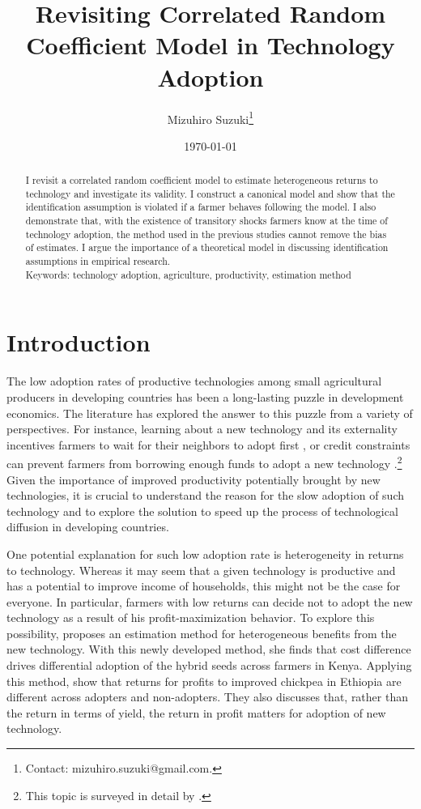 \documentclass[11pt,letterpaper]{article}
\title{Revisiting Correlated Random Coefficient Model in Technology Adoption}
\author{
  Mizuhiro Suzuki\thanks{
    Contact: mizuhiro.suzuki@gmail.com.
  }
}
\date{\today}
\begin{document}
  
\maketitle
\begin{abstract}
  \singlespacing
    \noindent 
    I revisit a correlated random coefficient model to estimate heterogeneous returns to technology and investigate its validity.
    I construct a canonical model and show that the identification assumption is violated if a farmer behaves following the model. 
    I also demonstrate that, with the existence of transitory shocks farmers know at the time of technology adoption, the method used in the previous studies cannot remove the bias of estimates.
    I argue the importance of a theoretical model in discussing identification assumptions in empirical research. \\

  \medskip
  \noindent Keywords: technology adoption, agriculture, productivity, estimation method
\end{abstract}

\newpage

\section{Introduction}

The low adoption rates of productive technologies among small agricultural producers in developing countries has been a long-lasting puzzle in development economics. 
The literature has explored the answer to this puzzle from a variety of perspectives.
For instance, learning about a new technology and its externality incentives farmers to wait for their neighbors to adopt first \citep{foster1995learning, conley2010learning}, or credit constraints can prevent farmers from borrowing enough funds to adopt a new technology \citep{gine2006credit}.\footnote{
  This topic is surveyed in detail by \citet{foster2010microeconomics}.
}
Given the importance of improved productivity potentially brought by new technologies, it is crucial to understand the reason for the slow adoption of such technology and to explore the solution to speed up the process of technological diffusion in developing countries.

One potential explanation for such low adoption rate is heterogeneity in returns to technology.
Whereas it may seem that a given technology is productive and has a potential to improve income of households, this might not be the case for everyone.
In particular, farmers with low returns can decide not to adopt the new technology as a result of his profit-maximization behavior.
To explore this possibility, \cite{Suri11} proposes an estimation method for heterogeneous benefits from the new technology.
With this newly developed method, she finds that cost difference drives differential adoption of the hybrid seeds across farmers in Kenya.
Applying this method, \cite{Michler2019} show that returns for profits to improved chickpea in Ethiopia are different across adopters and non-adopters.
They also discusses that, rather than the return in terms of yield, the return in profit matters for adoption of new technology.
\end{document}
